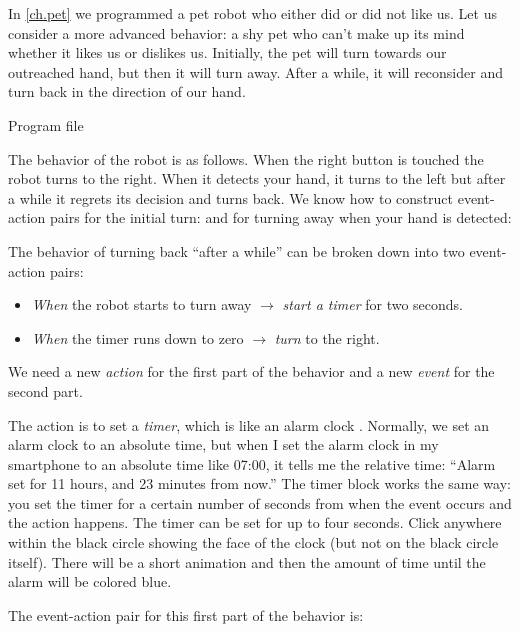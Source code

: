 
In \cref{ch.pet} we programmed a pet robot who either did or did
not like us. Let us consider a more advanced behavior: a shy pet who
can't make up its mind whether it likes us or dislikes us. Initially,
the pet will turn towards our outreached hand, but then it will turn
away. After a while, it will reconsider and turn back in the direction
of our hand.

{\raggedleft \hfill Program file }

The behavior of the robot is as follows. When the right button is
touched the robot turns to the right. When it detects your hand, it
turns to the left but after a while it regrets its decision and turns
back. We know how to construct event-action pairs for the initial turn:
 and for turning away when your hand is detected:

The behavior of turning back ``after a while'' can be broken down into
two event-action pairs:

\begin{itemize}

\item \emph{When} the robot starts to turn away $\rightarrow$
\emph{start a timer} for two seconds.

\item \emph{When} the timer runs down to zero $\rightarrow$ \emph{turn}
to the right.

\end{itemize}

We need a new \emph{action} for the first part of the behavior and a new
\emph{event} for the second part.

The action is to set a \emph{timer}, which is like an alarm clock
. Normally, we set an alarm clock to an absolute time,
but when I set the alarm clock in my smartphone to an absolute time like
07:00, it tells me the relative time: ``Alarm set for 11 hours, and 23
minutes from now.'' The timer block works the same way: you set the
timer for a certain number of seconds from when the event occurs and the
action happens. The timer can be set for up to four seconds. Click
anywhere within the black circle showing the face of the clock (but not
on the black circle itself). There will be a short animation and then
the amount of time until the alarm will be colored blue.

\newpage
The event-action pair for this first part of the behavior is:

